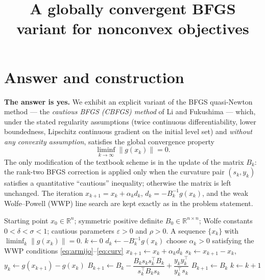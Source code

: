 \documentclass{amsart}
\theoremstyle{definition}
\newcommand{\R}{\mathbb{R}}
\newcommand{\norm}[1]{\left\lVert #1\right\rVert}
\begin{document}
\title{A globally convergent BFGS variant for nonconvex objectives}
\maketitle

\section{Answer and construction}

\textbf{The answer is yes.} We exhibit an explicit variant of the BFGS
quasi-Newton method --- the \emph{cautious BFGS (CBFGS) method} of Li and
Fukushima --- which, under the stated regularity assumptions (twice continuous
differentiability, lower boundedness, Lipschitz continuous gradient on the
initial level set) and \emph{without any convexity assumption}, satisfies the
global convergence property
\[
   \liminf_{k\to\infty}\norm{g(x_k)}=0 .
\]
The only modification of the textbook scheme is in the update of the matrix
$B_k$: the rank-two BFGS correction is applied only when the curvature pair
$(s_k,y_k)$ satisfies a quantitative ``cautious'' inequality; otherwise the
matrix is left unchanged. The iteration $x_{k+1}=x_k+\alpha_k d_k$,
$d_k=-B_k^{-1}g(x_k)$, and the weak Wolfe--Powell (WWP) line search are kept
exactly as in the problem statement.

\begin{algorithm}[h]
\caption{Cautious BFGS (CBFGS) method}
\label{alg:cbfgs}
\begin{algorithmic}[1]
  \Require Starting point $x_0\in\R^n$; symmetric positive definite
           $B_0\in\R^{n\times n}$; Wolfe constants $0<\delta<\sigma<1$;
           cautious parameters $\varepsilon>0$ and $\rho>0$.
  \Ensure A sequence $\{x_k\}$ with $\liminf_k\norm{g(x_k)}=0$.
  \State $k\gets0$
    \State $d_k\gets -B_k^{-1}g(x_k)$ 
    \State choose $\alpha_k>0$ satisfying the WWP conditions \eqref{eq:armijo}--\eqref{eq:curv}
    \State $x_{k+1}\gets x_k+\alpha_k d_k$
    \State $s_k\gets x_{k+1}-x_k$,\quad $y_k\gets g(x_{k+1})-g(x_k)$
    \If{$\dfrac{y_k^\top s_k}{\norm{s_k}^2}\ \ge\ \varepsilon\,\norm{g(x_k)}^{\rho}$}
       \State $B_{k+1}\gets B_k-\dfrac{B_k s_k s_k^\top B_k}{s_k^\top B_k s_k}
                                 +\dfrac{y_k y_k^\top}{y_k^\top s_k}$
    \Else
       \State $B_{k+1}\gets B_k$ 
    \EndIf
    \State $k\gets k+1$
  \EndWhile
\end{algorithmic}
\end{algorithm}
\end{document}
